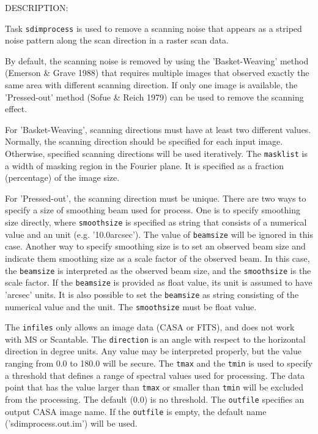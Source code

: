 DESCRIPTION:

Task {\tt sdimprocess} is used to remove a scanning noise that appears 
as a striped noise pattern along the scan direction in a raster 
scan data. 

By default, the scanning noise is removed by using the 
'Basket-Weaving' method (Emerson \& Grave 1988) that requires 
multiple images that observed exactly the same area with different 
scanning direction. If only one image is available, the 'Pressed-out' 
method (Sofue \& Reich 1979) can be used to remove the scanning effect.

For 'Basket-Weaving', scanning directions must have at least two 
different values. Normally, the scanning direction should be 
specified for each input image. Otherwise, specified scanning 
directions will be used iteratively. The {\tt masklist} is a width of 
masking region in the Fourier plane. It is specified as a fraction 
(percentage) of the image size. 

For 'Pressed-out', the scanning direction must be unique. There are 
two ways to specify a size of smoothing beam used for process. One 
is to specify smoothing size directly, where {\tt smoothsize} is specified
as string that consists of a numerical value and an unit 
(e.g. '10.0arcsec'). The value of {\tt beamsize} will be ignored in this case. 
Another way to specify smoothing size is to set an observed beam size 
and indicate them smoothing size as a scale factor of the observed beam.
In this case, the {\tt beamsize} is interpreted as the observed beam 
size, and the {\tt smoothsize} is the scale factor. If the {\tt beamsize} is 
provided as float value, its unit is assumed to have 'arcsec' units. It is also 
possible to set the {\tt beamsize} as string consisting of the numerical 
value and the unit. The {\tt smoothsize} must be float value.

The {\tt infiles} only allows an image data (CASA or FITS), and does
not work with MS or Scantable. The {\tt direction} is an angle with respect 
to the horizontal direction in degree units. Any value may be 
interpreted properly, but the value ranging from 0.0 to 180.0 will be 
secure. The {\tt tmax} and the {\tt tmin} is used to specify a threshold that 
defines a range of spectral values used for processing. The data point 
that has the value larger than {\tt tmax} or smaller than {\tt tmin} will be 
excluded from the processing. The default (0.0) is no threshold. 
The {\tt outfile} specifies an output CASA image name. If the {\tt outfile} 
is empty, the default name ('sdimprocess.out.im') will be used. 


